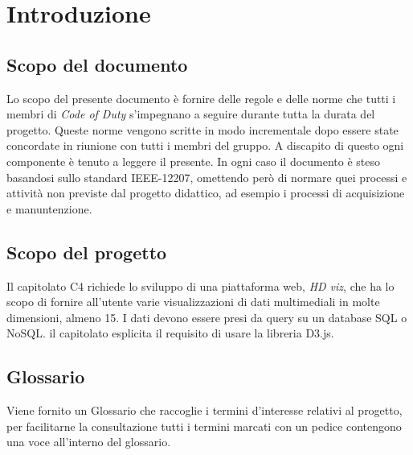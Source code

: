 \section{Introduzione}
    \subsection{Scopo del documento}
    Lo scopo del presente documento è fornire delle regole e delle norme che tutti i membri di \textit{Code of Duty} s'impegnano a seguire durante tutta la durata del progetto. Queste norme vengono scritte in modo incrementale dopo essere state concordate in riunione con tutti i membri del gruppo.
    A discapito di questo ogni componente è tenuto a leggere il presente.
    In ogni caso il documento è steso basandosi sullo standard IEEE-12207, omettendo però di normare quei processi e attività non previste dal progetto didattico, ad esempio i processi di acquisizione e manuntenzione. 
    \subsection{Scopo del progetto}
    Il capitolato C4 richiede lo sviluppo di una piattaforma web, \textit{HD viz}, che ha lo scopo di fornire all'utente varie visualizzazioni di dati multimediali in molte dimensioni, almeno 15. I dati devono essere presi da query su un database SQL o NoSQL. il capitolato esplicita il requisito di usare la libreria D3.js.
    \subsection{Glossario}
    Viene fornito un Glossario che raccoglie i termini d'interesse relativi al progetto, per facilitarne la consultazione tutti i termini marcati con un pedice \glo{} contengono una voce all'interno del glossario.
